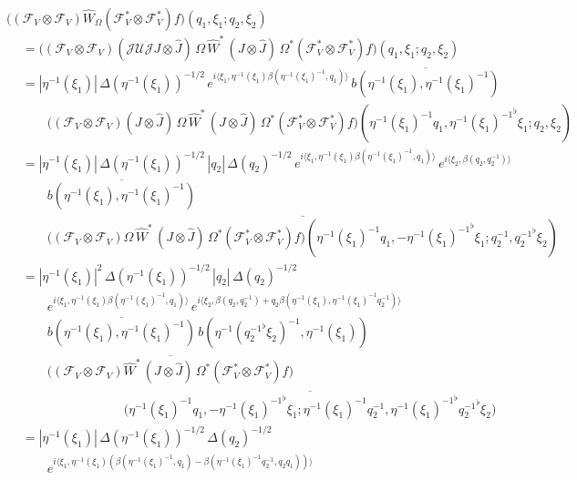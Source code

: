\documentclass[a4paper,11pt,reqno]{amsart}
\numberwithin{equation}{section}
\theoremstyle{remark}
\theoremstyle{definition}
\newcommand{\CJ}{\mathcal J}
\newcommand{\CF}{\mathcal F}
\begin{document}
\medskip
$\displaystyle \big((\CF_V\otimes\CF_V)\hat W_\Omega (\CF_V^*\otimes\CF_V^*)f\big)(q_1,\xi_1;q_2,\xi_2)$
\begin{align*}
&= \big((\CF_V\otimes\CF_V)(\CJ \mathcal U \CJ J\otimes\hat J)\,\Omega\,\hat W^*\,(J\otimes\hat J)\,\Omega^* (\CF_V^*\otimes\CF_V^*)f\big)(q_1,\xi_1;q_2,\xi_2)\\
&=|\eta^{-1}(\xi_1)|\,\Delta(\eta^{-1}(\xi_1))^{-1/2}\,e^{i\langle \xi_1 ,\eta^{-1}(\xi_1)\beta(\eta^{-1}(\xi_1)^{-1},q_1)\rangle}\,
 \overline {b(\eta^{-1}(\xi_1),\eta^{-1}(\xi_1)^{-1})}\\
&\qquad \big((\CF_V\otimes\CF_V)( J\otimes\hat J)\,\Omega\,\hat W^*\,(J\otimes\hat J)\,\Omega^*
  (\CF_V^*\otimes\CF_V^*)f\big)(\eta^{-1}(\xi_1)^{-1}q_1,{\eta^{-1}(\xi_1)^{-1}}^\flat\xi_1;q_2,\xi_2)\\
&=|\eta^{-1}(\xi_1)|\,\Delta(\eta^{-1}(\xi_1))^{-1/2}\,|q_2|\,\Delta(q_2)^{-1/2}\, e^{i\langle \xi_1 ,\eta^{-1}(\xi_1)\beta(\eta^{-1}(\xi_1)^{-1},q_1)\rangle}\,e^{i\langle \xi_2,\beta(q_2,q_2^{-1})\rangle}\\
&\qquad\overline {b(\eta^{-1}(\xi_1),\eta^{-1}(\xi_1)^{-1})}\\
&\qquad \overline{ \big((\CF_V\otimes\CF_V)\Omega\,\hat W^*\,(J\otimes\hat J)\,\Omega^*
  (\CF_V^*\otimes\CF_V^*)f\big)(\eta^{-1}(\xi_1)^{-1}q_1,-{\eta^{-1}(\xi_1)^{-1}}^\flat\xi_1;q_2^{-1},{q_2^{-1}}^\flat\xi_2)}\\
&=|\eta^{-1}(\xi_1)|^2\,\Delta(\eta^{-1}(\xi_1))^{-1/2}\,|q_2|\,\Delta(q_2)^{-1/2}\\
&\qquad  e^{i\langle \xi_1 ,\eta^{-1}(\xi_1)\beta(\eta^{-1}(\xi_1)^{-1},q_1)\rangle}\,e^{i\langle \xi_2,\beta(q_2,q_2^{-1})+q_2\beta(\eta^{-1}(\xi_1),\eta^{-1}(\xi_1)^{-1}q_2^{-1})\rangle}\\
&\qquad\overline{b(\eta^{-1}(\xi_1),\eta^{-1}(\xi_1)^{-1})}\, b(\eta^{-1}({q_2^{-1}}^\flat\xi_2)^{-1},\eta^{-1}(\xi_1))\\
&\qquad\overline{ \big((\CF_V\otimes\CF_V)\hat W^*\,(J\otimes\hat J)\,\Omega^*
  (\CF_V^*\otimes\CF_V^*)f\big)}\\
&\qquad\qquad\qquad\qquad\overline{\big(\eta^{-1}(\xi_1)^{-1}q_1, -{\eta^{-1}(\xi_1)^{-1}}^\flat\xi_1 ;\eta^{-1}(\xi_1)^{-1}q_2^{-1},{\eta^{-1}(\xi_1)^{-1}}^\flat{q_2^{-1}}^\flat\xi_2\big)}\\
&=|\eta^{-1}(\xi_1)|\,\Delta(\eta^{-1}(\xi_1))^{-1/2}\,\Delta(q_2)^{-1/2}\\
&\qquad
  e^{i\langle \xi_1 ,\eta^{-1}(\xi_1)(\beta(\eta^{-1}(\xi_1)^{-1},q_1)-\beta(\eta^{-1}(\xi_1)^{-1}q_2^{-1},q_2q_1))\rangle}\,

\end{align*}
\end{document}
